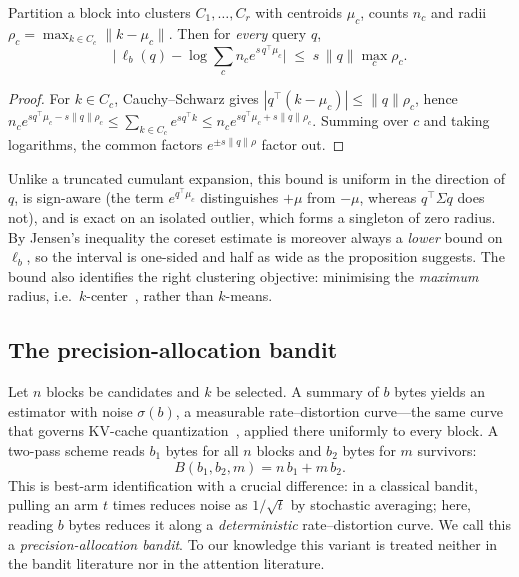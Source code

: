 \documentclass[sigconf,nonacm,11pt]{acmart}
\begin{document}
\begin{proposition}\label{prop:bound}
Partition a block into clusters $C_1,\dots,C_r$ with centroids $\mu_c$, counts
$n_c$ and radii $\rho_c=\max_{k\in C_c}\|k-\mu_c\|$. Then for \emph{every} query $q$,
\begin{equation}
\Big|\,\ell_b(q)-\log\textstyle\sum_c n_c e^{s\,q^\top\mu_c}\Big|\;\le\;s\,\|q\|\max_c \rho_c .
\end{equation}
\end{proposition}
\begin{proof}
For $k\in C_c$, Cauchy--Schwarz gives $|q^\top(k-\mu_c)|\le\|q\|\rho_c$, hence
$n_c e^{s q^\top\mu_c-s\|q\|\rho_c}\le\sum_{k\in C_c}e^{s q^\top k}\le
 n_c e^{s q^\top\mu_c+s\|q\|\rho_c}$. Summing over $c$ and taking logarithms, the
common factors $e^{\pm s\|q\|\rho}$ factor out.
\end{proof}

Unlike a truncated cumulant expansion, this bound is uniform in the direction of
$q$, is sign-aware (the term $e^{q^\top\mu_c}$ distinguishes $+\mu$ from $-\mu$,
whereas $q^\top\Sigma q$ does not), and is exact on an isolated outlier, which
forms a singleton of zero radius. By Jensen's inequality the coreset estimate is
moreover always a \emph{lower} bound on $\ell_b$, so the interval is one-sided
and half as wide as the proposition suggests. The bound also identifies the right
clustering objective: minimising the \emph{maximum} radius, i.e.\
$k$-center~\cite{gonzalez1985clustering}, rather than $k$-means.

\subsection{The precision-allocation bandit}

Let $n$ blocks be candidates and $k$ be selected. A summary of $b$ bytes yields an
estimator with noise $\sigma(b)$, a measurable rate--distortion curve---the same
curve that governs KV-cache quantization~\cite{turboquant2025,blockgtq2026}, applied
there uniformly to every block. A two-pass
scheme reads $b_1$ bytes for all $n$ blocks and $b_2$ bytes for $m$ survivors:
\begin{equation}
B(b_1,b_2,m)=n\,b_1+m\,b_2 .
\end{equation}
This is best-arm identification with a crucial difference: in a classical bandit,
pulling an arm $t$ times reduces noise as $1/\sqrt t$ by stochastic averaging;
here, reading $b$ bytes reduces it along a \emph{deterministic} rate--distortion
curve. We call this a \emph{precision-allocation bandit}. To our knowledge this
variant is treated neither in the bandit literature nor in the attention literature.
\end{document}
